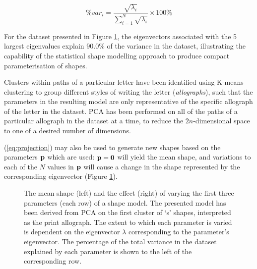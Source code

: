 \documentclass{sig-alternate}
\begin{document}
\begin{equation}\label{eq:proportionVar}
\%var_i = \frac{\sqrt{\lambda_i}}{\sum_{i=1}^{N}\sqrt{\lambda_i}}\times 100\%
\end{equation}

For the dataset presented in Figure \ref{fig:deviations_sPrint}, the
eigenvectors associated with the 5 largest eigenvalues explain 90.0\% of the
variance in the dataset, illustrating the capability of the statistical shape
modelling approach to produce compact parameterisation of shapes. 

Clusters within paths of a particular letter have been identified using K-means
clustering to group different styles of writing the letter (\emph{allographs}),
such that the parameters in the resulting model are only representative of the
specific allograph of the letter in the dataset. 
%
%
PCA has been performed on all of the paths of a particular allograph in the
dataset at a time, to reduce the $2n$-dimensional space to one of a desired
number of dimensions.

(\ref{eq:projection}) may also be used
to generate new shapes based on the parameters ${\bf p}$ which are used: ${\bf
p}={\bf 0}$ will yield the mean shape, and variations to each of the $N$ values
in ${\bf p}$ will cause a change in the shape represented by the corresponding
eigenvector (Figure \ref{fig:deviations_sPrint}). 

\begin{figure}[thpb]
\centering
{}
\caption[The mean shape and the effect of varying the first three parameters of
the shape model derived from PCA from the dataset of print `s'
shapes.]{\label{fig:deviations_sPrint}The mean shape (left) and the effect
    (right) of varying the first three parameters (each row) of a shape model.
    The presented model has been derived from PCA on the first cluster of `s'
    shapes, interpreted as the print allograph. The extent to which each
parameter is varied is dependent on the eigenvector $\lambda$ corresponding to
the parameter's eigenvector. The percentage of the total variance in the dataset
explained by each parameter is shown to the left of the corresponding row. }

\end{figure}
\end{document}
